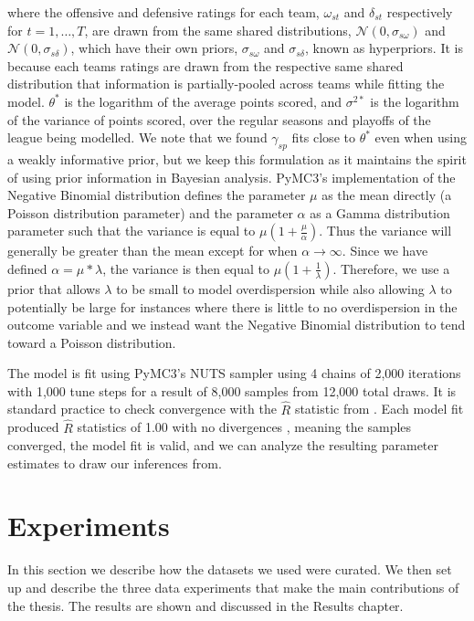 where the offensive and defensive ratings for each team, \(\omega_{st}\) and \(\delta_{st}\) respectively for \(t=1,\dots,T\), are drawn from the same shared distributions, \(\mathcal{N}(0, \sigma_{s\omega})\) and \(\mathcal{N}(0, \sigma_{s\delta})\), which have their own priors, \(\sigma_{s\omega}\) and \(\sigma_{s\delta}\), known as hyperpriors. It is because each teams ratings are drawn from the respective same shared distribution that information is partially-pooled across teams while fitting the model. \(\theta^*\) is the logarithm of the average points scored, and \(\sigma^{2*}\) is the logarithm of the variance of points scored, over the regular seasons and playoffs of the league being modelled. We note that we found \(\gamma_{sp}\) fits close to \(\theta^*\) even when using a weakly informative prior, but we keep this formulation as it maintains the spirit of using prior information in Bayesian analysis. PyMC3's implementation of the Negative Binomial distribution defines the parameter \(\mu\) as the mean directly (a Poisson distribution parameter) and the parameter \(\alpha\) as a Gamma distribution parameter \cite{pymc3} such that the variance is equal to \(\mu\left(1 + \frac{\mu}{\alpha}\right)\). Thus the variance will generally be greater than the mean except for when \(\alpha \to \infty \). Since we have defined \(\alpha = \mu * \lambda\), the variance is then equal to \(\mu\left( 1 + \frac{1}{\lambda}\right)\). Therefore, we use a prior that allows \(\lambda\) to be small to model overdispersion while also allowing \(\lambda\) to potentially be large for instances where there is little to no overdispersion in the outcome variable and we instead want the Negative Binomial distribution to tend toward a Poisson distribution.

The model is fit using PyMC3's NUTS sampler using 4 chains of 2,000 iterations with 1,000 tune steps for a result of 8,000 samples from 12,000 total draws. It is standard practice to check convergence with the \(\hat{R}\) statistic from \cite{Gelman1992} \cite{Brooks1997}.  Each model fit produced \(\hat{R}\) statistics of 1.00 with no divergences \cite{Betancourt2017}, meaning the samples converged, the model fit is valid, and we can analyze the resulting parameter estimates to draw our inferences from.

\section{Experiments}

In this section we describe how the datasets we used were curated. We then set up and describe the three data experiments that make the main contributions of the thesis. The results are shown and discussed in the Results chapter.

